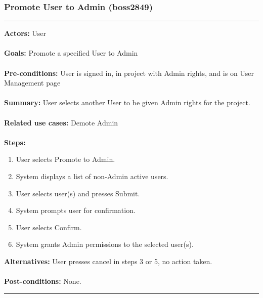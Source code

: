 \documentclass[11pt]{report}
\begin{document}
\subsubsection{Promote User to Admin  (boss2849)}
\vspace{2pt}
\hrule
\vspace{8pt}
 \textbf{Actors:} User \\ \\
\textbf{Goals:} Promote a specified User to Admin \\ \\
 \textbf{Pre-conditions:} User is signed in, in project with Admin rights, and is on User Management page \\ \\
 \textbf{Summary:} User selects another User to be given Admin rights for the project. \\ \\
\textbf{Related use cases:} Demote Admin \\ \\
\textbf{Steps:} \begin{enumerate}
  \item User selects Promote to Admin.
  \item System displays a list of non-Admin active users.
  \item User selects user(s) and presses Submit.
  \item System prompts user for confirmation.
  \item User selects Confirm.
  \item System grants Admin permissions to the selected user(s).
 \end{enumerate}
 \textbf{Alternatives:} User presses cancel in steps 3 or 5, no action taken. \\ \\
 \textbf{Post-conditions:} None. \\
\vspace{8pt}
\hrule
\newpage
\end{document}
